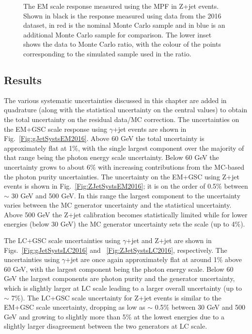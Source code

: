 \begin{figure}[!ht]
 \begin{center}
 \end{center}
 \caption[EM scale response using Z+jet in 2016]
 {\small The EM scale response measured using the MPF in Z+jet events.  Shown in black is the response measured using data from the 2016 dataset, in red is the nominal Monte Carlo sample and in blue is an additional Monte Carlo sample for comparison.  The lower inset shows the data to Monte Carlo ratio, with the colour of the points corresponding to the simulated sample used in the ratio.  }
 \label{Fig:ZJetEM2016}
\end{figure}

\subsection{Results}

The various systematic uncertainties discussed in this chapter are added in quadrature (along with the statistical uncertainty on the central values) to obtain the total uncertainty on the residual data/MC correction.  
The uncertainties on the EM+GSC scale response using $\gamma$+jet events are shown in Fig.~\ref{Fig:gJetSystsEM2016}.  
Above 60 GeV the total uncertainty is approximately flat at 1\%, with the single largest component over the majority of that range being the photon energy scale uncertainty.  
Below 60 GeV the uncertainty grows to about 6\% with increasing contributions from the MC-based the photon purity uncertainties.  
The uncertainty on the EM+GSC using Z+jet events is shown in Fig.~\ref{Fig:ZJetSystsEM2016}; it is on the order of 0.5\% between $\sim$ 30 GeV and 500 GeV.  
In this range the largest component to the uncertainty varies between the MC generator uncertainty and the statistical uncertainty.  
Above 500 GeV the Z+jet calibration becomes statistically limited while for lower energies (below 30 GeV) the MC generator uncertainty sets the scale (up to 4\%). 

The LC+GSC scale uncertainties using $\gamma$+jet and Z+jet are shown in Figs.~\ref{Fig:gJetSystsLC2016} and ~\ref{Fig:ZJetSystsLC2016}, respectively.  
The uncertainties using $\gamma$+jet are once again approximately flat at around 1\% above 60 GeV, with the largest component being the photon energy scale.  
Below 60 GeV the largest components are photon purity and the generator uncertainty, which is slightly larger at LC scale leading to a larger overall uncertainty (up to $\sim$ 7\%).  
The LC+GSC scale uncertainty for Z+jet events is similar to the EM+GSC scale uncertainty, dropping as low as $\sim$ 0.5\% between 30 GeV and 500 GeV and growing to slightly more than 5\% at the lowest energies due to a slightly larger disagreement between the two generators at LC scale.  

